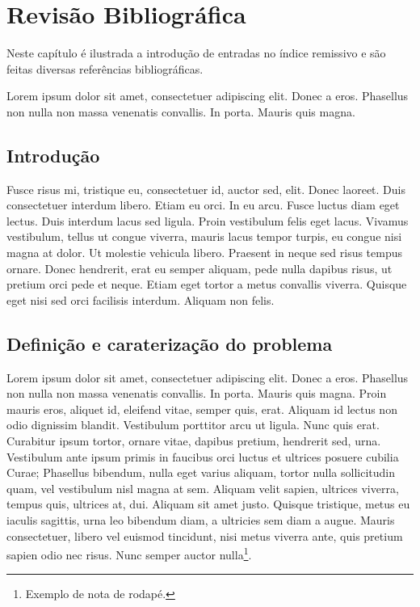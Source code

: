 \chapter{Revisão Bibliográfica} \label{chap:sota}

Neste capítulo é ilustrada a introdução de entradas no índice
remissivo e são feitas diversas referências bibliográficas.

Lorem ipsum dolor sit amet, consectetuer adipiscing elit. Donec a
eros. Phasellus non nulla non massa venenatis convallis. In
porta. Mauris quis magna. 


\section{Introdução}

Fusce risus mi, tristique eu, consectetuer id, auctor sed, elit. Donec
laoreet. Duis consectetuer interdum libero. Etiam eu orci. In eu
arcu. Fusce luctus diam eget lectus. Duis interdum lacus sed
ligula. Proin vestibulum felis eget lacus. Vivamus vestibulum, tellus
ut congue viverra, mauris lacus tempor turpis, eu congue nisi magna at
dolor. Ut molestie vehicula libero. Praesent in neque sed risus tempus
ornare. Donec hendrerit, erat eu semper aliquam, pede nulla dapibus
risus, ut pretium orci pede et neque.
Etiam eget tortor a metus convallis viverra. Quisque eget nisi sed
orci facilisis interdum. Aliquam non felis. 


\section{Definição e caraterização do problema}\label{sec:problem}

Lorem ipsum dolor sit amet, consectetuer adipiscing elit. Donec a
eros. Phasellus non nulla non massa venenatis convallis. In
porta. Mauris quis magna. Proin mauris eros, aliquet id, eleifend
vitae, semper quis, erat. Aliquam id lectus non odio dignissim
blandit. Vestibulum porttitor arcu ut ligula. Nunc quis
erat. Curabitur ipsum tortor, ornare vitae, dapibus pretium, hendrerit
sed, urna. Vestibulum ante ipsum primis in faucibus orci luctus et
ultrices posuere cubilia Curae; Phasellus bibendum, nulla eget varius
aliquam, tortor nulla sollicitudin quam, vel vestibulum nisl magna at
sem. Aliquam velit sapien, ultrices viverra, tempus quis, ultrices at,
dui. Aliquam sit amet justo. Quisque tristique, metus eu iaculis
sagittis, urna leo bibendum diam, a ultricies sem diam a augue. Mauris
consectetuer, libero vel euismod tincidunt, nisi metus viverra ante,
quis pretium sapien odio nec risus. Nunc semper auctor
nulla\footnote{Exemplo de nota de rodapé.}. 


